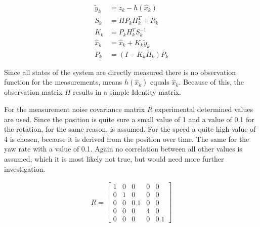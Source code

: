 \documentclass[11pt,oneside,openright]{mpreport}
\begin{document}
\begin{align*}
\tilde{y}_k &= z_k -h(\hat{x}_{k})\\
S_k &= H P_k H^T_k + R_k\\
K_k &= P_k H^T_k S_k^{-1}\\
\hat{x}_k &= \hat{x}_k + K_k \tilde{y}_k\\
P_k &= (I - K_k H_k) P_k
\end{align*}


Since all states of the system are directly measured there is no observation function for the measurements, means 
$h(\hat{x}_k)$ equals $\hat{x}_k$. Because of this, the observation matrix $H$ results in a simple Identity matrix.

For the measurement noise covariance matrix $R$ experimental determined values are used. Since the position is quite sure a small value of 1 
and a value of 0.1 for the rotation, for the same reason, is assumed. For the speed a quite high value of 4 is chosen,
because it is derived from the position over time. The same for the yaw rate with a value of 0.1. Again no correlation between all other values is assumed,
which it is most likely not true, but would need more further investigation.

\begin{align*}
R=
\begin{bmatrix}
1 & 0 & 0 & 0 & 0\\
0 & 1 & 0 & 0 & 0\\
0 & 0 & 0.1 & 0 & 0\\
0 & 0 & 0 & 4 & 0\\
0 & 0 & 0 & 0 & 0.1
\end{bmatrix} 
\end{align*}





\end{document}
